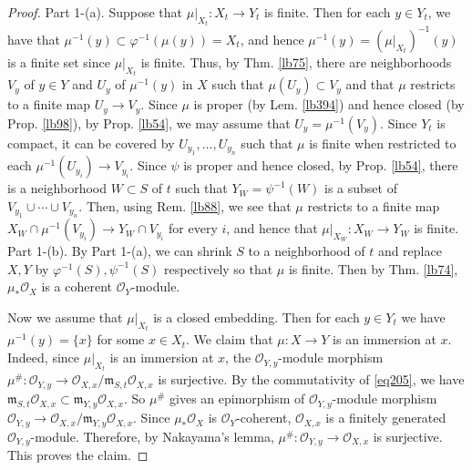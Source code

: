 \documentclass[12pt,b5paper,notitlepage]{report}
\theoremstyle{definition}
\theoremstyle{plain}
\newcommand{\scr}{\mathscr}
\newcommand{\mk}{\mathfrak m}
\numberwithin{equation}{section}
\begin{document}
\begin{proof}
Part 1-(a). Suppose that $\mu|_{X_t}:X_t\rightarrow Y_t$ is finite. Then for each $y\in Y_t$, we have that $\mu^{-1}(y)\subset \varphi^{-1}(\mu(y))=X_t$, and hence $\mu^{-1}(y)=(\mu|_{X_t})^{-1}(y)$ is a finite set since $\mu|_{X_t}$ is finite. Thus, by Thm. \ref{lb75}, there are neighborhoods $V_y$ of $y\in Y$ and $U_y$ of $\mu^{-1}(y)$ in $X$ such that $\mu(U_y)\subset V_y$ and that $\mu$ restricts to a finite map $U_y\rightarrow V_y$.  Since $\mu$ is proper (by Lem. \ref{lb394}) and hence closed (by Prop. \ref{lb98}), by Prop. \ref{lb54}, we may assume that $U_y=\mu^{-1}(V_y)$. Since $Y_t$ is compact, it can be covered by $U_{y_1},\dots,U_{y_n}$ such that $\mu$ is finite when restricted to each $\mu^{-1}(U_{y_i})\rightarrow V_{y_i}$. Since $\psi$ is proper and hence closed, by Prop. \ref{lb54}, there is a neighborhood $W\subset S$ of $t$ such that $Y_W=\psi^{-1}(W)$ is a subset of $V_{y_1}\cup\cdots\cup V_{y_n}$. Then, using Rem. \ref{lb88}, we see that $\mu$ restricts to a finite map $X_W\cap \mu^{-1}(V_{y_i})\rightarrow Y_W\cap V_{y_i}$ for every $i$, and hence that $\mu|_{X_W}:X_W\rightarrow Y_W$ is finite.\\[-1ex]  



Part 1-(b). By Part 1-(a), we can shrink $S$ to a neighborhood of $t$ and replace $X,Y$ by $\varphi^{-1}(S),\psi^{-1}(S)$ respectively so that $\mu$ is finite. Then by Thm. \ref{lb74}, $\mu_*\scr O_X$ is a coherent $\scr O_Y$-module. 

Now we assume that $\mu|_{X_t}$ is a closed embedding. Then for each $y\in Y_t$ we have $\mu^{-1}(y)=\{x\}$ for some $x\in X_t$. We claim that $\mu:X\rightarrow Y$ is an immersion at $x$. Indeed, since $\mu|_{X_t}$ is an immersion at $x$, the $\scr O_{Y,y}$-module morphism $\mu^\#:\scr O_{Y,y}\rightarrow\scr O_{X,x}/\mk_{S,t}\scr O_{X,x}$ is surjective. By the commutativity of \eqref{eq205}, we have $\mk_{S,t}\scr O_{X,x}\subset \mk_{Y,y}\scr O_{X,x}$. So $\mu^\#$ gives an epimorphism of $\scr O_{Y,y}$-module morphism $\scr O_{Y,y}\rightarrow\scr O_{X,x}/\mk_{Y,y}\scr O_{X,x}$. Since $\mu_*\scr O_X$ is $\scr O_Y$-coherent, $\scr O_{X,x}$ is a finitely generated $\scr O_{Y,y}$-module. Therefore, by Nakayama's lemma, $\mu^\#:\scr O_{Y,y}\rightarrow\scr O_{X,x}$ is surjective. This proves the claim.


\end{proof}
\end{document}
